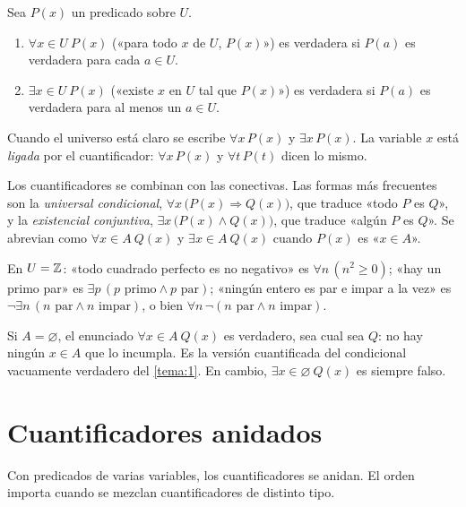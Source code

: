 \begin{definicion}[Cuantificadores]\label{def:cuantificadores}
Sea $P(x)$ un predicado sobre $U$.
\begin{enumerate}
  \item $\forall x\in U\ P(x)$ («para todo $x$ de $U$, $P(x)$») es verdadera si $P(a)$ es verdadera para cada $a\in U$.
  \item $\exists x\in U\ P(x)$ («existe $x$ en $U$ tal que $P(x)$») es verdadera si $P(a)$ es verdadera para al menos un $a\in U$.
\end{enumerate}
Cuando el universo está claro se escribe $\forall x\,P(x)$ y $\exists x\,P(x)$. La variable $x$ está \emph{ligada} por el cuantificador: $\forall x\,P(x)$ y $\forall t\,P(t)$ dicen lo mismo.
\end{definicion}

Los cuantificadores se combinan con las conectivas. Las formas más frecuentes son la \emph{universal condicional}, $\forall x\,\bigl(P(x)\Rightarrow Q(x)\bigr)$, que traduce «todo $P$ es $Q$», y la \emph{existencial conjuntiva}, $\exists x\,\bigl(P(x)\wedge Q(x)\bigr)$, que traduce «algún $P$ es $Q$». Se abrevian como $\forall x\in A\ Q(x)$ y $\exists x\in A\ Q(x)$ cuando $P(x)$ es «$x\in A$».

\begin{ejemplo}\label{ej:traduccion}
En $U=\mathbb{Z}$: «todo cuadrado perfecto es no negativo» es $\forall n\,(n^{2}\ge 0)$; «hay un primo par» es $\exists p\,(p\text{ primo}\wedge p\text{ par})$; «ningún entero es par e impar a la vez» es $\neg\exists n\,(n\text{ par}\wedge n\text{ impar})$, o bien $\forall n\,\neg(n\text{ par}\wedge n\text{ impar})$.
\end{ejemplo}

\begin{observacion}
Si $A=\varnothing$, el enunciado $\forall x\in A\ Q(x)$ es verdadero, sea cual sea $Q$: no hay ningún $x\in A$ que lo incumpla. Es la versión cuantificada del condicional vacuamente verdadero del \cref{tema:1}. En cambio, $\exists x\in\varnothing\ Q(x)$ es siempre falso.
\end{observacion}

\section{Cuantificadores anidados}

Con predicados de varias variables, los cuantificadores se anidan. El orden importa cuando se mezclan cuantificadores de distinto tipo.

